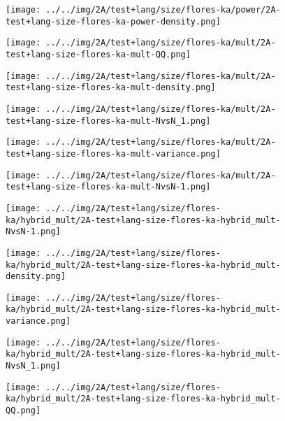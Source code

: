 \begin{figure}[H]
\centering	\texttt{[image: ../../img/2A/test+lang/size/flores-ka/power/2A-test+lang-size-flores-ka-power-density.png]}
\end{figure}
\begin{figure}[H]
\centering	\texttt{[image: ../../img/2A/test+lang/size/flores-ka/mult/2A-test+lang-size-flores-ka-mult-QQ.png]}
\end{figure}
\begin{figure}[H]
\centering	\texttt{[image: ../../img/2A/test+lang/size/flores-ka/mult/2A-test+lang-size-flores-ka-mult-density.png]}
\end{figure}
\begin{figure}[H]
\centering	\texttt{[image: ../../img/2A/test+lang/size/flores-ka/mult/2A-test+lang-size-flores-ka-mult-NvsN\_1.png]}
\end{figure}
\begin{figure}[H]
\centering	\texttt{[image: ../../img/2A/test+lang/size/flores-ka/mult/2A-test+lang-size-flores-ka-mult-variance.png]}
\end{figure}
\begin{figure}[H]
\centering	\texttt{[image: ../../img/2A/test+lang/size/flores-ka/mult/2A-test+lang-size-flores-ka-mult-NvsN-1.png]}
\end{figure}
\begin{figure}[H]
\centering	\texttt{[image: ../../img/2A/test+lang/size/flores-ka/hybrid\_mult/2A-test+lang-size-flores-ka-hybrid\_mult-NvsN-1.png]}
\end{figure}
\begin{figure}[H]
\centering	\texttt{[image: ../../img/2A/test+lang/size/flores-ka/hybrid\_mult/2A-test+lang-size-flores-ka-hybrid\_mult-density.png]}
\end{figure}
\begin{figure}[H]
\centering	\texttt{[image: ../../img/2A/test+lang/size/flores-ka/hybrid\_mult/2A-test+lang-size-flores-ka-hybrid\_mult-variance.png]}
\end{figure}
\begin{figure}[H]
\centering	\texttt{[image: ../../img/2A/test+lang/size/flores-ka/hybrid\_mult/2A-test+lang-size-flores-ka-hybrid\_mult-NvsN\_1.png]}
\end{figure}
\begin{figure}[H]
\centering	\texttt{[image: ../../img/2A/test+lang/size/flores-ka/hybrid\_mult/2A-test+lang-size-flores-ka-hybrid\_mult-QQ.png]}
\end{figure}
